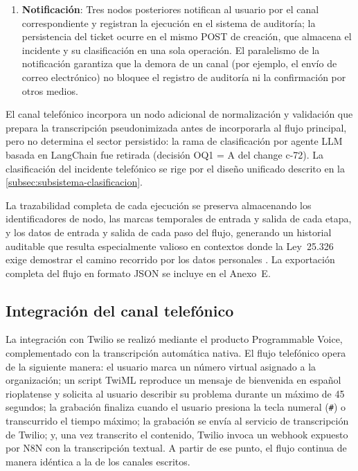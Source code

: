 \begin{enumerate}[leftmargin=*]
  \item \textbf{Notificación}: Tres nodos posteriores notifican al usuario por el canal correspondiente y registran la ejecución en el sistema de auditoría; la persistencia del ticket ocurre en el mismo POST de creación, que almacena el incidente y su clasificación en una sola operación. El paralelismo de la notificación garantiza que la demora de un canal (por ejemplo, el envío de correo electrónico) no bloquee el registro de auditoría ni la confirmación por otros medios.
\end{enumerate}

El canal telefónico incorpora un nodo adicional de normalización y validación que prepara la transcripción pseudonimizada antes de incorporarla al flujo principal, pero no determina el sector persistido: la rama de clasificación por agente LLM basada en LangChain fue retirada (decisión OQ1 = A del change c-72). La clasificación del incidente telefónico se rige por el diseño unificado descrito en la \autoref{subsec:subsistema-clasificacion}.

La trazabilidad completa de cada ejecución se preserva almacenando los identificadores de nodo, las marcas temporales de entrada y salida de cada etapa, y los datos de entrada y salida de cada paso del flujo, generando un historial auditable que resulta especialmente valioso en contextos donde la Ley~25.326 exige demostrar el camino recorrido por los datos personales \parencite{Ley25326_2000}. La exportación completa del flujo en formato JSON se incluye en el Anexo~E.

\subsection{Integración del canal telefónico}\label{subsec:integracion-canal-telefonico}

La integración con Twilio se realizó mediante el producto Programmable Voice, complementado con la transcripción automática nativa. El flujo telefónico opera de la siguiente manera: el usuario marca un número virtual asignado a la organización; un script TwiML reproduce un mensaje de bienvenida en español rioplatense y solicita al usuario describir su problema durante un máximo de 45 segundos; la grabación finaliza cuando el usuario presiona la tecla numeral (\texttt{\#}) o transcurrido el tiempo máximo; la grabación se envía al servicio de transcripción de Twilio; y, una vez transcrito el contenido, Twilio invoca un webhook expuesto por N8N con la transcripción textual. A partir de ese punto, el flujo continua de manera idéntica a la de los canales escritos.

